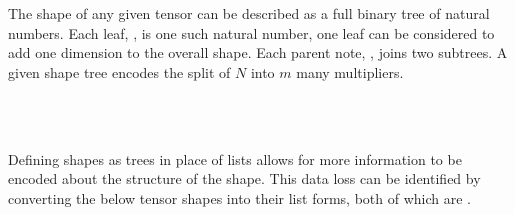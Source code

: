 \begin{AgdaAlign}
\begin{code}[hide]
\\
\>[4][@{}l@{\AgdaIndent{0}}]%
\>[6]\AgdaSpace{}%
\AgdaSpace{}%
\AgdaSymbol{:}\AgdaSpace{}%
\<%
\\
%
\>[6]\AgdaSpace{}%
\AgdaSpace{}%
\AgdaSpace{}%
\AgdaSymbol{:}\AgdaSpace{}%
\<%
\end{code}
The shape of any given tensor can be described as a full binary tree of natural 
numbers.
Each leaf, , is one such natural number, one leaf 
can be considered to add one dimension to the overall shape. 
Each parent note, , joins two subtrees.
A given shape tree encodes the split of $N$ into $m$ many multipliers.

\begin{code}%
%
\>[2]\AgdaSpace{}%
\AgdaSpace{}%
\AgdaSymbol{:}\AgdaSpace{}%
\AgdaSpace{}%
\<%
\\
\>[2][@{}l@{\AgdaIndent{0}}]%
\>[4]%
\>[8]\AgdaSymbol{:}\AgdaSpace{}%
\AgdaSpace{}%
\AgdaSpace{}%
\<%
\\
%
\>[4]\AgdaSpace{}%
\AgdaSymbol{:}\AgdaSpace{}%
\AgdaSpace{}%
\AgdaSpace{}%
\AgdaSpace{}%
\AgdaSpace{}%
\<%
\end{code}

Defining shapes as trees in place of lists allows for more information to be 
encoded about the structure of the shape. 
This data loss can be identified by converting the below tensor shapes into their
list forms, both of which are .


\end{AgdaAlign}
